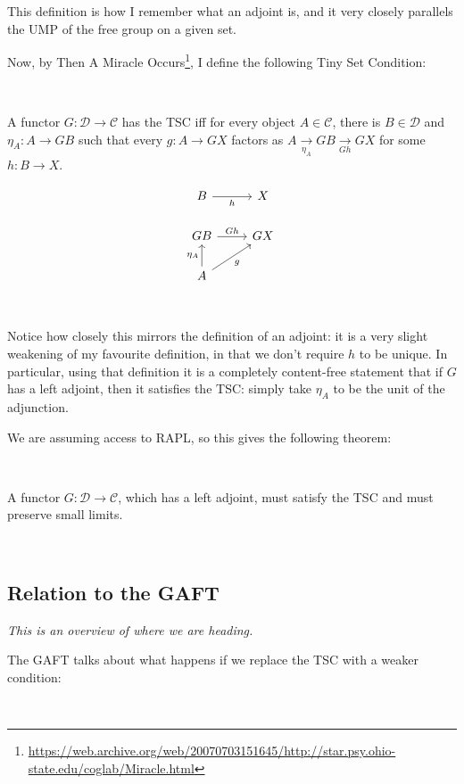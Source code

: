 \documentclass[11pt]{amsart}
\begin{document}
This definition is how I remember what an adjoint is, and it very closely parallels the UMP of the free group on a given set.

Now, by Then A Miracle Occurs\footnote{\tiny{\url{https://web.archive.org/web/20070703151645/http://star.psy.ohio-state.edu/coglab/Miracle.html}}}, I define the following Tiny Set Condition:

\

\begin{defn} A functor $G: \mathcal{D} \to \mathcal{C}$ has the TSC iff for every object $A \in \mathcal{C}$, there is $B \in \mathcal{D}$ and $\eta_A : A \to GB$ such that every $g: A \to GX$ factors as $A \xrightarrow[\eta_A]{} GB \xrightarrow[Gh]{} GX$ for some $h: B \to X$.

\[
\begin{tikzcd}
B
    \arrow[r, "h"']
& X
\\
GB
    \arrow[r, "Gh"]
& GX
\\
A
    \arrow[u, "\eta_A"]
    \arrow[ur, "g"']
&
\end{tikzcd}
\]
\end{defn}

\

Notice how closely this mirrors the definition of an adjoint: it is a very slight weakening of my favourite definition, in that we don't require $h$ to be unique.
In particular, using that definition it is a completely content-free statement that if $G$ has a left adjoint, then it satisfies the TSC: simply take $\eta_A$ to be the unit of the adjunction.

We are assuming access to RAPL, so this gives the following theorem:

\

\begin{thm} A functor $G: \mathcal{D} \to \mathcal{C}$, which has a left adjoint, must satisfy the TSC and must preserve small limits.
\end{thm}

\

\subsection{Relation to the GAFT}

\emph{This is an overview of where we are heading.}

The GAFT talks about what happens if we replace the TSC with a weaker condition:

\
\end{document}
